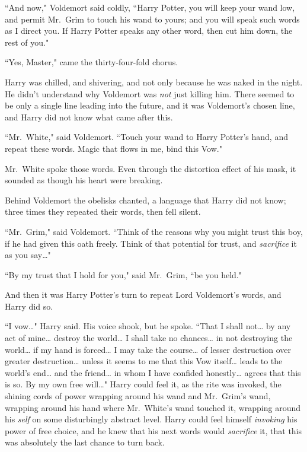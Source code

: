 ``And now," Voldemort said coldly, ``Harry Potter, you will keep your wand low, and permit Mr.~Grim to touch his wand to yours; and you will speak such words as I direct you. If Harry Potter speaks any other word, then cut him down, the rest of you."

``Yes, Master," came the thirty-four-fold chorus.

Harry was chilled, and shivering, and not only because he was naked in the night. He didn't understand why Voldemort was \emph{not} just killing him. There seemed to be only a single line leading into the future, and it was Voldemort's chosen line, and Harry did not know what came after this.

``Mr.~White," said Voldemort. ``Touch your wand to Harry Potter's hand, and repeat these words. Magic that flows in me, bind this Vow."

Mr.~White spoke those words. Even through the distortion effect of his mask, it sounded as though his heart were breaking.

Behind Voldemort the obelisks chanted, a language that Harry did not know; three times they repeated their words, then fell silent.

``Mr.~Grim," said Voldemort. ``Think of the reasons why you might trust this boy, if he had given this oath freely. Think of that potential for trust, and \emph{sacrifice} it as you say{\ldots}"

``By my trust that I hold for you," said Mr.~Grim, ``be you held."

And then it was Harry Potter's turn to repeat Lord Voldemort's words, and Harry did so.

``I vow{\ldots}" Harry said. His voice shook, but he spoke. ``That I shall not{\ldots} by any act of mine{\ldots} destroy the world{\ldots} I shall take no chances{\ldots} in not destroying the world{\ldots} if my hand is forced{\ldots} I may take the course{\ldots} of lesser destruction over greater destruction{\ldots} unless it seems to me that this Vow itself{\ldots} leads to the world's end{\ldots} and the friend{\ldots} in whom I have confided honestly{\ldots} agrees that this is so. By my own free will{\ldots}" Harry could feel it, as the rite was invoked, the shining cords of power wrapping around his wand and Mr.~Grim's wand, wrapping around his hand where Mr.~White's wand touched it, wrapping around his \emph{self} on some disturbingly abstract level. Harry could feel himself \emph{invoking} his power of free choice, and he knew that his next words would \emph{sacrifice} it, that this was absolutely the last chance to turn back.

